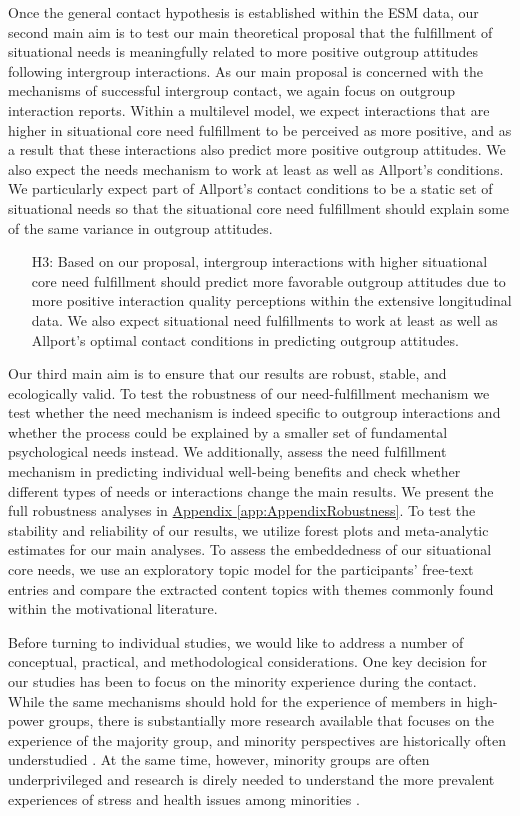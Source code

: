 \documentclass[man, 12pt, a4paper, mask]{apa7}
\theoremstyle{break}
\theoremstyle{plain}
\newcommand{\appref}[2][]{\hyperref[#2]{Appendix \ref*{#2}#1}}
\begin{document}
Once the general contact hypothesis is established within the ESM data, our second main aim is to test our main theoretical proposal that the fulfillment of situational needs is meaningfully related to more positive outgroup attitudes following intergroup interactions. As our main proposal is concerned with the mechanisms of successful intergroup contact, we again focus on outgroup interaction reports. Within a multilevel model, we expect interactions that are higher in situational core need fulfillment to be perceived as more positive, and as a result that these interactions also predict more positive outgroup attitudes. We also expect the needs mechanism to work at least as well as Allport's conditions. We particularly expect part of Allport's contact conditions to be a static set of situational needs so that the situational core need fulfillment should explain some of the same variance in outgroup attitudes.
\begin{enumerate}[leftmargin=1.5\parindent]
    \item[H3:] Based on our proposal, intergroup interactions with higher situational core need fulfillment should predict more favorable outgroup attitudes due to more positive interaction quality perceptions within the extensive longitudinal data. We also expect situational need fulfillments to work at least as well as Allport's optimal contact conditions in predicting outgroup attitudes.
\end{enumerate}

Our third main aim is to ensure that our results are robust, stable, and ecologically valid. To test the robustness of our need-fulfillment mechanism we test whether the need mechanism is indeed specific to outgroup interactions and whether the process could be explained by a smaller set of fundamental psychological needs instead. We additionally, assess the need fulfillment mechanism in predicting individual well-being benefits and check whether different types of needs or interactions change the main results. We present the full robustness analyses in \appref{app:AppendixRobustness}. To test the stability and reliability of our results, we utilize forest plots and meta-analytic estimates for our main analyses. To assess the embeddedness of our situational core needs, we use an exploratory topic model for the participants' free-text entries and compare the extracted content topics with themes commonly found within the motivational literature.

Before turning to individual studies, we would like to address a number of conceptual, practical, and methodological considerations. One key decision for our studies has been to focus on the minority experience during the contact. While the same mechanisms should hold for the experience of members in high-power groups, there is substantially more research available that focuses on the experience of the majority group, and minority perspectives are historically often understudied \citep[e.g.,][]{Dovidio2017}. At the same time, however, minority groups are often underprivileged and research is direly needed to understand the more prevalent experiences of stress and health issues among minorities \citep[e.g.,][]{alvidrez2019}. 
\end{document}
